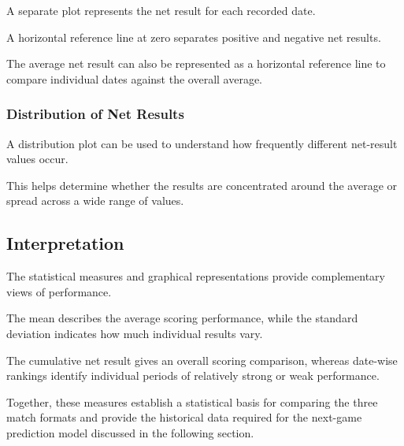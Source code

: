 A separate plot represents the net result for each
recorded date.

A horizontal reference line at zero separates
positive and negative net results.

The average net result can also be represented as
a horizontal reference line to compare individual
dates against the overall average.

\subsubsection{Distribution of Net Results}

A distribution plot can be used to understand how
frequently different net-result values occur.

This helps determine whether the results are
concentrated around the average or spread across a
wide range of values.

\subsection{Interpretation}

The statistical measures and graphical
representations provide complementary views of
performance.

The mean describes the average scoring performance,
while the standard deviation indicates how much
individual results vary.

The cumulative net result gives an overall scoring
comparison, whereas date-wise rankings identify
individual periods of relatively strong or weak
performance.

Together, these measures establish a statistical
basis for comparing the three match formats and
provide the historical data required for the
next-game prediction model discussed in the
following section.


